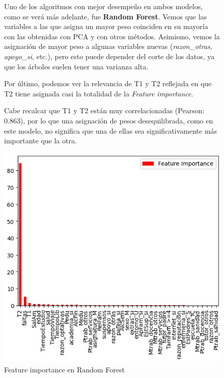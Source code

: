 \documentclass{article}
\begin{document}
\begin{figure}[h!]
  \centering
  \begin{minipage}{0.65\textwidth}
    Uno de los algoritmos con mejor desempeño en ambos modelos, como se verá más adelante, fue \textbf{Random Forest}. 
    Vemos que las variables a las que asigna un mayor peso coinciden en su mayoría con las obtenidas con PCA y con otros métodos. Asimismo, vemos la asignación de mayor peso a algunas variables nuevas (\textit{razon\_otras, apoyo\_si}, etc.), pero esto puede depender del corte de los datos,
    ya que los árboles suelen tener una varianza alta.

    Por último, podemos ver la relevancia de T1 y T2 reflejada en que T2 tiene asignada casi la totalidad de la \textit{Feature importance}. 
    
    Cabe recalcar que T1 y T2 están muy correlacionadas (Pearson: 0.863), por lo que una asignación de pesos desequilibrada, como en este modelo, no significa que una de ellas sea significativamente más importante que la otra.
  \end{minipage}
  \hfill
  \begin{minipage}{0.3\textwidth}
      \centering
      \includegraphics[width=\textwidth]{RF_var.png}
      \caption{Feature importance en Random Forest}
      \label{fig:RF}
  \end{minipage}
\end{figure}
\end{document}

